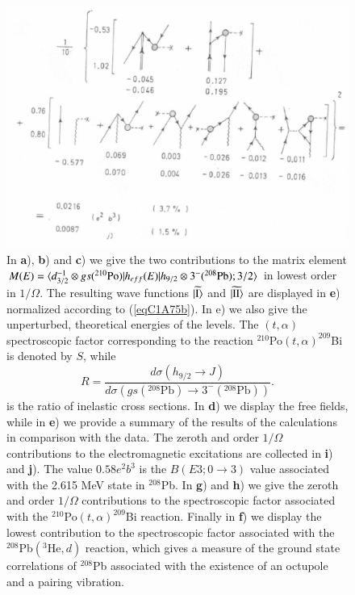                    \begin{figure}
                   \captionsetup{singlelinecheck=off}
                   \centerline {
                   \includegraphics*[width=12cm]{introduccion/figs/fig24c}
                   }
                   \caption[.]{In \textbf{a}), \textbf{b}) and \textbf{c}) we give the two contributions to the matrix element $M(E)=\langle {d_{3/2}^{-1}\otimes gs(^{210}\text{Po})|h_{eff}(E)|h_{9/2}\otimes 3^-(^{208}\text{Pb});3/2} \rangle$ in lowest order in $1/\Omega.$ The resulting wave functions $\widetilde{|{\text{I}} \rangle}$ and $\widetilde{|{\text{II}} \rangle}$ are displayed in \textbf{e}) normalized according to (\ref{eqC1A75b}). In e) we also give the unperturbed, theoretical energies of the levels. The $(t,\alpha)$ spectroscopic factor corresponding to the reaction $^{210}$Po$(t,\alpha)^{209}$Bi is denoted by $S$, while 
                   \begin{equation*}
                   R=\frac{d\sigma(h_{9/2}\rightarrow J)}{d\sigma(gs(^{208}\text{Pb})\rightarrow3^-(^{208}\text{Pb}))}.
                   \end{equation*}
                   is the ratio of inelastic cross sections. In \textbf{d}) we display the free fields, while in \textbf{e}) we provide a summary of the results of the calculations in comparison with the data. The zeroth and order $1/\Omega$ contributions to the electromagnetic excitations are collected in \textbf{i}) and \textbf{j}). The value $0.58 e^2b^3$ is the $B(E3;0\rightarrow 3)$ value associated with the 2.615 MeV state in $^{208}$Pb. In \textbf{g}) and \textbf{h}) we give the zeroth and order $1/\Omega$ contributions to the spectroscopic factor associated with the $^{210}$Po$(t,\alpha)^{209}$Bi reaction. Finally in \textbf{f}) we display the lowest contribution to the spectroscopic factor associated with the $^{208}$Pb$(^3\text{He},d)$ reaction, which gives a measure of the ground state correlations of $^{208}$Pb associated with the existence of an octupole and a pairing vibration.}
                   \label{figC1A7}
                   \end{figure}
